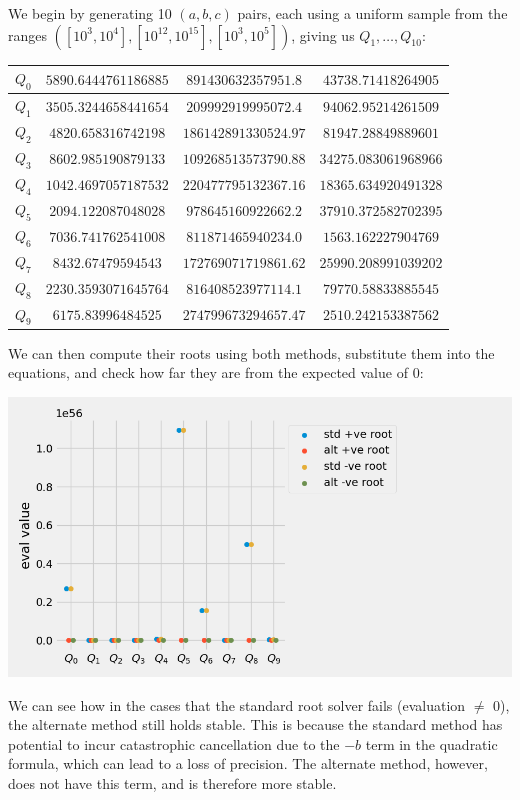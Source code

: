 We begin by generating 10 $(a, b, c)$ pairs, each using a uniform sample from the ranges $([10^3, 10^4], [10^{12}, 10^{15}], [10^3, 10^5])$, giving us $Q_1, \dots, Q_{10}$:

\begin{center}
	\begin{tabular}{|c|c|c|c|}
		\hline $Q_0$ & $5890.6444761186885$ & $891430632357951.8$ & $43738.71418264905$\\
		\hline $Q_1$ & $3505.3244658441654$ & $209992919995072.4$ & $94062.95214261509$\\
		\hline $Q_2$ & $4820.658316742198$ & $186142891330524.97$ & $81947.28849889601$\\
		\hline $Q_3$ & $8602.985190879133$ & $109268513573790.88$ & $34275.083061968966$\\
		\hline $Q_4$ & $1042.4697057187532$ & $220477795132367.16$ & $18365.634920491328$\\
		\hline $Q_5$ & $2094.122087048028$ & $978645160922662.2$ & $37910.372582702395$\\
		\hline $Q_6$ & $7036.741762541008$ & $811871465940234.0$ & $1563.162227904769$\\
		\hline $Q_7$ & $8432.67479594543$ & $172769071719861.62$ & $25990.208991039202$\\
		\hline $Q_8$ & $2230.3593071645764$ & $816408523977114.1$ & $79770.58833885545$\\
		\hline $Q_9$ & $6175.83996484525$ & $274799673294657.47$ & $2510.242153387562$\\
		\hline
	\end{tabular}
\end{center}

We can then compute their roots using both methods, substitute them into the equations, and check how far they are from the expected value of $0$:

\begin{center}
	\includegraphics*[width=\textwidth]{res/3.2-compare.png}
\end{center}

We can see how in the cases that the standard root solver fails (evaluation $\ne$ 0), the alternate method still holds stable. This is because the standard method has potential to incur catastrophic cancellation due to the $-b$ term in the quadratic formula, which can lead to a loss of precision. The alternate method, however, does not have this term, and is therefore more stable.